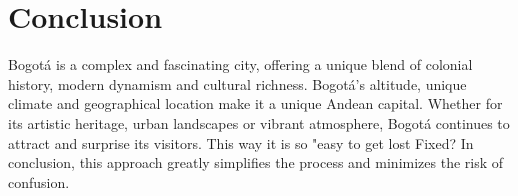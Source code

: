 \documentclass{article}
\begin{document}
\section{Conclusion}
Bogotá is a complex and fascinating city, offering a unique blend of colonial history, modern dynamism and cultural richness. Bogotá's altitude, unique climate and geographical location make it a unique Andean capital. Whether for its artistic heritage, urban landscapes or vibrant atmosphere, Bogotá continues to attract and surprise its visitors. This way it is so "easy to get lost Fixed? In conclusion, this approach greatly simplifies the process and minimizes the risk of confusion.
\end{document}
